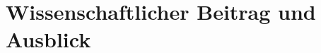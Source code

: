 

\chapter{Wissenschaftlicher Beitrag und Ausblick} 

\label{cha:wissenschaftlicher_beitrag_und_ausblick}

